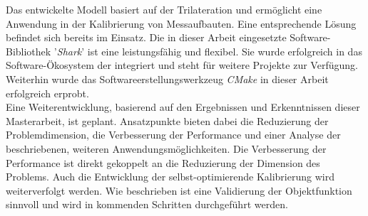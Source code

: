 Das entwickelte Modell basiert auf der Trilateration und ermöglicht eine Anwendung in der Kalibrierung von Messaufbauten. Eine entsprechende Lösung befindet sich bereits im Einsatz. Die in dieser Arbeit eingesetzte Software-Bibliothek '\textit{Shark}' ist eine leistungsfähig und flexibel. Sie wurde erfolgreich in das Software-Ökosystem der \amedogmbh integriert und steht für weitere Projekte zur Verfügung. Weiterhin wurde das Softwareerstellungswerkzeug \textit{CMake} in dieser Arbeit erfolgreich erprobt.\\

Eine Weiterentwicklung, basierend auf den Ergebnissen und Erkenntnissen dieser Masterarbeit, ist geplant. Ansatzpunkte bieten dabei die Reduzierung der Problemdimension, die Verbesserung der Performance und einer Analyse der beschriebenen, weiteren Anwendungsmöglichkeiten. Die Verbesserung der Performance ist direkt gekoppelt an die Reduzierung der Dimension des Problems. Auch die Entwicklung der selbst-optimierende Kalibrierung wird weiterverfolgt werden. Wie beschrieben ist eine Validierung der Objektfunktion sinnvoll und wird in kommenden Schritten durchgeführt werden.
